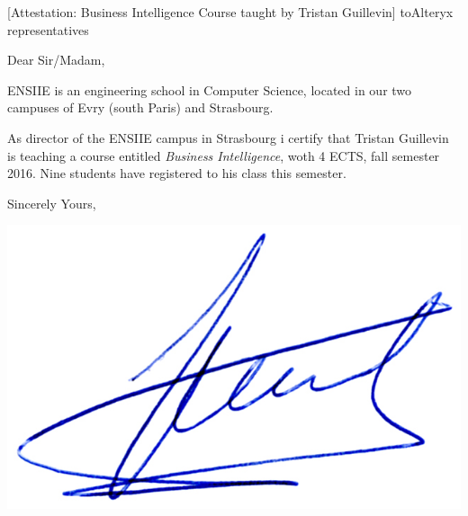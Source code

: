 \documentclass[a4paper,10pt]{article}
\begin{document}

\begin{letter}[Attestation: Business Intelligence Course taught by Tristan Guillevin]%
{to}{Alteryx representatives}
 

Dear Sir/Madam,

ENSIIE is an engineering school in Computer Science, located in our two campuses
of Evry (south Paris) and Strasbourg.  

As director of the ENSIIE campus in Strasbourg
i certify that Tristan Guillevin is teaching a course entitled 
\emph{Business Intelligence}, woth 4 ECTS, fall semester 2016. 
Nine students have registered to his class this semester.

Sincerely Yours,
\vspace{4cm}


\end{letter}
\begin{flushright}
\includegraphics[width=.30\textwidth]{signgenaud.jpg}
\end{flushright}
%
%
\end{document}
